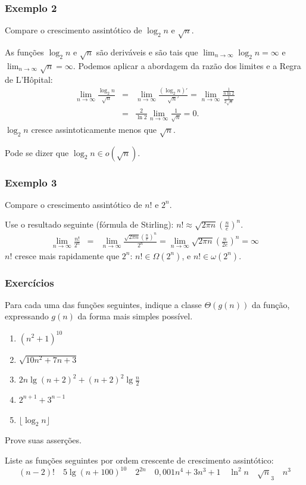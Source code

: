 \documentclass{beamer}
\begin{document}
\begin{frame}
\frametitle{Exemplo 2}
\begin{problem}
Compare o crescimento assintótico de $\log_2 n$ e $\sqrt{n}$.
\end{problem}
\pause
\begin{solution}
  As funções $\log_2 n$ e $\sqrt{n}$ são deriváveis e são tais que $\lim_{n \to
    \infty} \log_2 n = \infty$ e $\lim_{n \to \infty} \sqrt{n} =
  \infty$. Podemos aplicar a abordagem da razão dos limites e a Regra de
  L'Hôpital:
\begin{eqnarray*}
\lim_{n \to \infty} \frac{\log_2 n}{\sqrt{n}} & = & 
\lim_{n \to \infty} \frac{(\log_2 n)'}{\sqrt{n}'} = 
\lim_{n \to \infty} \frac{\frac{1}{n \ln 2}}{\frac{1}{2 \sqrt{n}}} \\
& = & \frac{2}{\ln 2} \lim_{n \to \infty} \frac{1}{\sqrt{n}} = 0.
\end{eqnarray*}
$\log_2 n$ cresce assintoticamente menos que $\sqrt{n}$.
\end{solution}
\pause
Pode se dizer que $\log_2 n \in o(\sqrt{n})$.
\end{frame}

\begin{frame}
\frametitle{Exemplo 3}
\begin{problem}
Compare o crescimento assintótico de $n!$ e $2^n$.
\end{problem}
Use o resultado seguinte (fórmula de Stirling): $n! \approx \sqrt{2 \pi n} \left( \frac{n}{e} \right)^n$.
\pause
\begin{eqnarray*}
\lim_{n \to \infty} \frac{n!}{2^n} & = & \lim_{n \to \infty} \frac{\sqrt{2 \pi n} \left( \frac{n}{e} \right)^n}{2^n} = \lim_{n \to \infty} \sqrt{2 \pi n} \left(\frac{n}{2 e}\right)^n = \infty
\end{eqnarray*}
$n!$ cresce mais rapidamente que $2^n$: $n! \in \Omega(2^n)$, e $n! \in
\omega(2^n)$.
\end{frame}

\begin{frame}
\frametitle{Exercícios}

\begin{problem}
Para cada uma das funções seguintes, indique a classe $\Theta(g(n))$ da 
função, expressando $g(n)$ da forma mais simples possível.
\begin{enumerate}
\item $(n^2+1)^{10}$
\item $\sqrt{10 n^2 + 7 n + 3}$
\item $2n \lg(n+2)^2 + (n+2)^2 \lg \frac{n}{2}$
\item $2^{n+1} + 3^{n-1}$
\item $\lfloor \log_2 n \rfloor$
\end{enumerate}
Prove suas asserções.
\end{problem}
\pause
\begin{problem}
  Liste as funções seguintes por ordem crescente de crescimento assintótico:
$$
(n-2)! \quad 5 \lg(n+100)^{10} \quad 2^{2n} \quad 0,001 n^4 + 3 n^3 + 1 \quad \ln^2 n \quad \sqrt{n}_3 \quad n^3
$$
\end{problem}


\end{frame}
\end{document}
